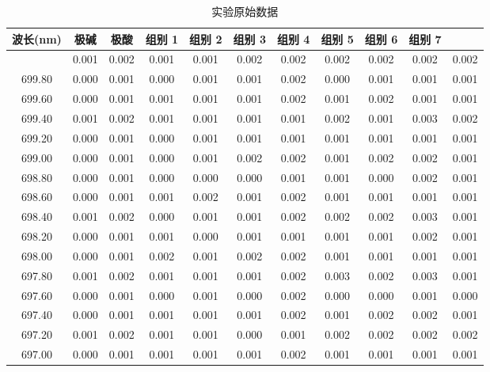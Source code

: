 
\begin{longtable}{cccccccccc}
    \caption{实验原始数据} \\
    \hline
    波长(nm) & 极碱 & 极酸 & 组别 1 & 组别 2 & 组别 3 &
    组别 4 & 组别 5 & 组别 6 & 组别 7 \\
    \hline
    \endhead
    \hline
     &  0.001 &  0.002 &  0.001 &  0.001 &  0.002 &  0.002 &  0.002 &  0.002 &  0.002 &  0.002 \\
    699.80 &  0.000 &  0.001 &  0.000 &  0.001 &  0.001 &  0.002 &  0.000 &  0.001 &  0.001 &  0.001 \\
    699.60 &  0.000 &  0.001 &  0.001 &  0.001 &  0.001 &  0.002 &  0.001 &  0.002 &  0.001 &  0.001 \\
    699.40 &  0.001 &  0.002 &  0.001 &  0.001 &  0.001 &  0.001 &  0.002 &  0.001 &  0.003 &  0.002 \\
    699.20 &  0.000 &  0.001 &  0.000 &  0.001 &  0.001 &  0.001 &  0.001 &  0.001 &  0.001 &  0.001 \\
    699.00 &  0.000 &  0.001 &  0.000 &  0.001 &  0.002 &  0.002 &  0.001 &  0.002 &  0.002 &  0.001 \\
    698.80 &  0.000 &  0.001 &  0.000 &  0.000 &  0.000 &  0.001 &  0.001 &  0.000 &  0.002 &  0.001 \\
    698.60 &  0.000 &  0.001 &  0.001 &  0.002 &  0.001 &  0.002 &  0.001 &  0.001 &  0.001 &  0.001 \\
    698.40 &  0.001 &  0.002 &  0.000 &  0.001 &  0.001 &  0.002 &  0.002 &  0.002 &  0.003 &  0.001 \\
    698.20 &  0.000 &  0.001 &  0.001 &  0.000 &  0.001 &  0.001 &  0.001 &  0.001 &  0.002 &  0.001 \\
    698.00 &  0.000 &  0.001 &  0.002 &  0.001 &  0.002 &  0.002 &  0.001 &  0.001 &  0.001 &  0.001 \\
    697.80 &  0.001 &  0.002 &  0.001 &  0.001 &  0.001 &  0.002 &  0.003 &  0.002 &  0.003 &  0.001 \\
    697.60 &  0.000 &  0.001 &  0.000 &  0.001 &  0.000 &  0.002 &  0.000 &  0.000 &  0.001 &  0.000 \\
    697.40 &  0.000 &  0.001 &  0.001 &  0.001 &  0.001 &  0.002 &  0.001 &  0.002 &  0.002 &  0.001 \\
    697.20 &  0.001 &  0.002 &  0.001 &  0.001 &  0.000 &  0.001 &  0.002 &  0.002 &  0.002 &  0.002 \\
    697.00 &  0.000 &  0.001 &  0.001 &  0.001 &  0.001 &  0.002 &  0.001 &  0.001 &  0.001 &  0.001 \\

\end{longtable}
